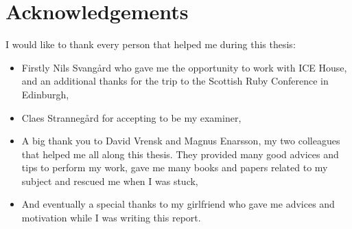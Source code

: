 \chapter*{Acknowledgements}

I would like to thank every person that helped me during this thesis:\\

\begin{itemize}

\item{Firstly Nils Svangård who gave me the opportunity to work with ICE House, and an additional thanks for the trip to the Scottish Ruby Conference in Edinburgh,}

\item{Claes Strannegård for accepting to be my examiner,}

\item{A big thank you to David Vrensk and Magnus Enarsson, my two colleagues that helped me all along this thesis. They provided many good advices and tips to perform my work, gave me many books and papers related to my subject and rescued me when I was stuck,}

\item{And eventually a special thanks to my girlfriend who gave me advices and motivation while I was writing this report.}

\end{itemize}